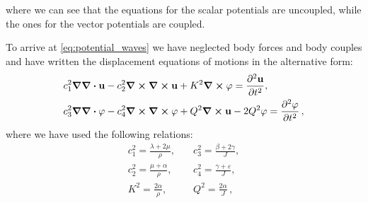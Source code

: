 \documentclass[12pt]{article}
\begin{document}
where we can see that the equations for the scalar potentials are uncoupled, while the ones
for the vector potentials are coupled.

To arrive at \eqref{eq:potential_waves} we have neglected body forces and body couples and have written the displacement equations of motions in the alternative form:
\begin{subequations}
  \begin{align}\label{eq:disp_waves}
    & c_1^2 \grad\div\vb{u} - c_2^2\curl\curl\vb{u} + K^2 \curl\vb{\varphi} =  \pdv[2]{\vb{u}}{t}, \\
    & c_3^2 \grad\div\vb{\varphi} - c_4^2 \curl\curl\vb{\varphi} +  Q^2 \curl\vb{u} - 2Q^2 \vb{\varphi} = \pdv[2]{\vb{\varphi}}{t}\, ,
  \end{align}
\end{subequations}
where we have used the following relations:
\begin{equation*}
\begin{split}
c_1^2 = \frac{\lambda +2\mu}{\rho},\quad &c_3^2 =\frac{\beta +2\gamma}{J},\\
c_2^2 = \frac{\mu +\alpha}{\rho},\quad &c_4^2 =\frac{\gamma + \varepsilon}{J},\\
K^2= \frac{2\alpha}{\rho},\quad &Q^2 =\frac{2\alpha}{J} \, ,
\end{split}
\end{equation*}
\end{document}
